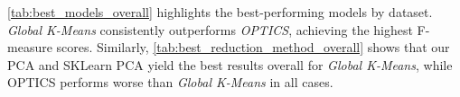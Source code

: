 \autoref{tab:best_models_overall} highlights the best-performing models by dataset. \textit{Global K-Means}
consistently outperforms \textit{OPTICS}, achieving the highest F-measure scores. Similarly,
\autoref{tab:best_reduction_method_overall} shows that our PCA and SKLearn PCA yield the best
results overall for \textit{Global K-Means}, while OPTICS performs worse than \textit{Global K-Means} in all cases.





